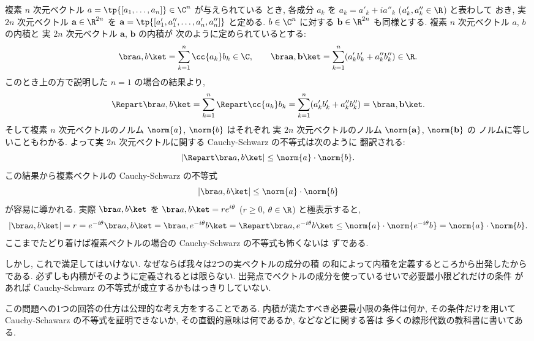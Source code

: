 \documentclass[12pt,twoside]{jarticle}
\begin{document}
複素 $n$ 次元ベクトル $a=\tp{[a_1,\dots,a_n]}\in\C^n$ が与えられている
とき, 各成分 $a_k$ を $a_k = a'_k + ia''_k$ ($a'_k,a''_k\in\R$) と表わして
おき, 実 $2n$ 次元ベクトル $\mathbf{a}\in\R^{2n}$ を $
  \mathbf{a} = \tp{[a'_1,a''_1,\dots,a'_n,a''_n]}
$ と定める.  $b\in\C^n$ に対する $\mathbf{b}\in\R^{2n}$ も同様とする.
複素 $n$ 次元ベクトル $a$, $b$ の内積と
実 $2n$ 次元ベクトル $\mathbf{a}$, $\mathbf{b}$ の内積が
次のように定められているとする:
\begin{equation*}
  \bra a,b\ket 
  = \sum_{k=1}^n \cc{a_k}b_k
  \in\C,
  \qquad
  \bra\mathbf{a},\mathbf{b}\ket 
  = \sum_{k=1}^n (a'_kb'_k + a''_kb''_k)
  \in\R.
\end{equation*}
このとき上の方で説明した $n=1$ の場合の結果より,
\begin{equation*}
  \Repart \bra a,b\ket 
  = \sum_{k=1}^n \Repart \cc{a_k}b_k
  = \sum_{k=1}^n (a'_kb'_k + a''_kb''_k)
  = \bra\mathbf{a},\mathbf{b}\ket.
\end{equation*}
そして複素 $n$ 次元ベクトルのノルム $\norm{a}$, $\norm{b}$ はそれぞれ
実 $2n$ 次元ベクトルのノルム $\norm{\mathbf{a}}$, $\norm{\mathbf{b}}$ の
ノルムに等しいこともわかる.
よって実 $2n$ 次元ベクトルに関する Cauchy-Schwarz の不等式は次のように
翻訳される:
\begin{equation*}
  |\Repart \bra a,b\ket| \le \norm{a}\cdot\norm{b}.
\end{equation*}
この結果から複素ベクトルの Cauchy-Schwarz の不等式
\begin{equation*}
  |\bra a,b\ket| \le \norm{a}\cdot\norm{b}
\end{equation*}
が容易に導かれる.  実際 $\bra a,b\ket$ を $\bra a,b\ket=re^{i\theta}$ 
($r\ge 0$, $\theta\in\R$) と極表示すると,
\begin{equation*}
  |\bra a,b\ket|
  = r
  = e^{-i\theta}\bra a,b\ket
  = \bra a, e^{-i\theta}b\ket
  = \Repart \bra a, e^{-i\theta}b\ket
  \le \norm{a}\cdot\norm{e^{-i\theta}b}
  = \norm{a}\cdot\norm{b}.
\end{equation*}
ここまでたどり着けば複素ベクトルの場合の Cauchy-Schwarz の不等式も怖くないは
ずである.

しかし, これで満足してはいけない.  なぜならば我々は2つの実ベクトルの成分の積
の和によって内積を定義するところから出発したからである.  
必ずしも内積がそのように定義されるとは限らない.
出発点でベクトルの成分を使っているせいで必要最小限どれだけの条件
があれば Cauchy-Schwarz の不等式が成立するかもはっきりしていない.

この問題への1つの回答の仕方は公理的な考え方をすることである.
内積が満たすべき必要最小限の条件は何か, その条件だけを用いて Cauchy-Schawarz 
の不等式を証明できないか,  その直観的意味は何であるか,  などなどに関する答は
多くの線形代数の教科書に書いてある.
\end{document}
